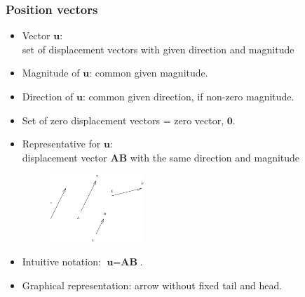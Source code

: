 \begin{frame}
\frametitle{Position vectors}

  \begin{itemize}
   \item Vector $\textbf{u}$: \\
      set of displacement vectors with given direction and magnitude

    \item  Magnitude of $\textbf{u}$: common given magnitude.

    \item Direction of $\textbf{u}$: common given direction, if non-zero magnitude.

    \item Set of zero displacement vectors = zero vector, $\textbf{0}$. \pause

    \item Representative for $\textbf{u}$: \\
      displacement vector $\textbf{AB}$ with the same direction and magnitude

\begin{figure}[h]
  \includegraphics[height=1in]{../../modules/vectors/pictures/ok-vector_representatives.eps}
  \label{fig:vector_representative}

\end{figure}

    \item Intuitive notation:  $\textbf{u}=\textbf{AB}$.

    \item Graphical representation: arrow without fixed tail and head.

  \end{itemize}
\end{frame}